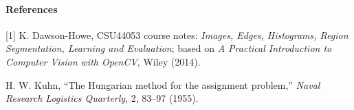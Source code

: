 \documentclass[12pt,a4paper]{article}
\begin{document}
\paragraph{References}
\small
[1] K. Dawson-Howe, CSU44053 course notes: \emph{Images, Edges, Histograms, Region
Segmentation, Learning and Evaluation}; based on \emph{A Practical Introduction to
Computer Vision with OpenCV}, Wiley (2014).\par
[2] H. W. Kuhn, ``The Hungarian method for the assignment problem,''
\emph{Naval Research Logistics Quarterly}, 2, 83--97 (1955).
\end{document}
